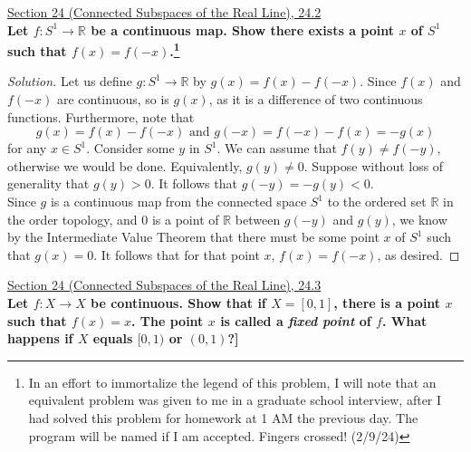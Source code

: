 \documentclass[11pt]{article}
\newcommand{\R}{\mathbb{R}}
\newenvironment{solution}
  {\renewcommand\qedsymbol{$\blacksquare$}\begin{proof}[Solution]}
  {\end{proof}}
\begin{document}
\newpage

\underline{Section 24 (Connected Subspaces of the Real Line), 24.2} \\

\textbf{Let $f \colon S^1 \rightarrow \R$ be a continuous map. Show there exists a point $x$ of $S^1$ such that $f(x) = f(-x)$.\footnote{In an effort to immortalize the legend of this problem, I will note that an equivalent problem was given to me in a graduate school interview,
after I had solved this problem for homework at 1 AM the previous day. The program will be named if I am accepted. Fingers crossed! (2/9/24)}}

\begin{solution}
Let us define $g \colon S^1 \rightarrow \R$ by $g(x) = f(x) - f(-x)$. Since $f(x)$ and $f(-x)$ are continuous, so is $g(x)$, as it is a difference of two continuous functions. 
Furthermore, note that
\[
	g(x) = f(x) - f(-x) \text{ and } g(-x) = f(-x) - f(x) = -g(x)
\]
for any $x \in S^1$. Consider some $y$ in $S^1$. We can assume that $f(y) \neq f(-y)$, otherwise we would be done. 
Equivalently, $g(y) \neq 0$. Suppose without loss of generality that $g(y) > 0$. It follows that $g(-y) = -g(y) < 0$.\\

Since $g$ is a continuous map from the connected space $S^1$ to the ordered set $\R$ in the order topology, and $0$ is a point of $\R$ between $g(-y)$ and $g(y)$, we know by the Intermediate Value Theorem that there must be some point
$x$ of $S^1$ such that $g(x) = 0$. It follows that for that point $x$, $f(x) = f(-x)$, as desired.
\end{solution}

\underline{Section 24 (Connected Subspaces of the Real Line), 24.3} \\

\textbf{Let $f \colon X \rightarrow X$ be continuous. Show that if $X = [0, 1]$, there is a point $x$ such that $f(x) = x$. The point $x$ is called a \textit{fixed point} of $f$.
What happens if $X$ equals $[0, 1)$ or $(0, 1)$?]}
\end{document}
